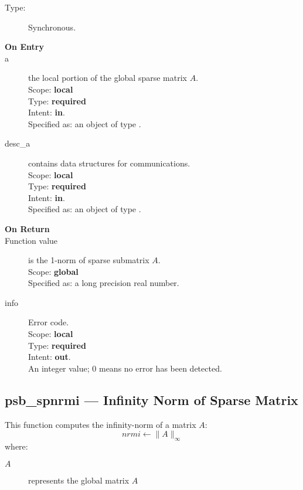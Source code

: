\begin{description}
\item[Type:] Synchronous.
\item[\bf On Entry]
\item[a] the local  portion of the global sparse matrix
$A$. \\   
Scope: {\bf local} \\
Type: {\bf required}\\
Intent: {\bf in}.\\
Specified as: an object of type \spdata.
\item[desc\_a] contains data structures for communications.\\
Scope: {\bf local} \\
Type: {\bf required}\\
Intent: {\bf in}.\\
Specified as: an object of type \descdata.
\item[\bf On Return] 
\item[Function value] is the 1-norm of sparse submatrix $A$.\\
Scope: {\bf global} \\
Specified as: a long precision real number.
\item[info] Error code.\\
Scope: {\bf local} \\
Type: {\bf required} \\
Intent: {\bf out}.\\
An integer value; 0 means no error has been detected. 
\end{description}


%
%


\clearpage\subsection*{psb\_spnrmi --- Infinity Norm of Sparse Matrix}

This function computes the infinity-norm of a matrix $A$:\\

\[ nrmi \leftarrow \|A\|_\infty \]
where:
\begin{description}
\item[$A$] represents the global matrix $A$
\end{description}

